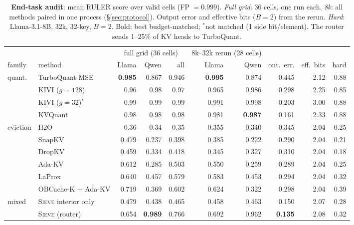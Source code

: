 \documentclass{article}
\newif\ifshowest \showesttrue
\DeclareRobustCommand{\est}[1]{\ifshowest{\color{estcol}#1}\else---\fi}
\DeclareRobustCommand{\estalt}[2]{\ifshowest#1\else#2\fi}
\newcommand{\sieve}{\textsc{Sieve}}
\theoremstyle{definition}
\begin{document}
\begin{table}[t]
\centering
\footnotesize
\setlength{\tabcolsep}{2.6pt}
\caption{\textbf{End-task audit}: mean RULER score over valid cells (FP $=0.999$). \emph{Full grid}: 36 cells, one run each. \emph{8k}: all methods paired in one process (\S\ref{sec:protocol}).
Output error and effective bits ($B=2$) from the rerun. \emph{Hard}: Llama-3.1-8B, 32k, 32-key, $B=2$. Bold: best budget-matched; $^\ast$not matched (1 side bit/element). The router sends 1--25\% of KV heads to TurboQuant.
}
\label{tab:endtask}
\begin{tabular}{@{}llrrrrrrrr@{}}
\toprule
& & \multicolumn{3}{c}{full grid (36 cells)} & \multicolumn{2}{c}{8k--32k rerun (28 cells)} & & & \\
\cmidrule(lr){3-5}\cmidrule(lr){6-7}
family & method & Llama & Qwen & all & Llama & Qwen & out.\ err. & eff.\ bits & hard \\
\midrule
\multirow{4}{*}{quant.} & TurboQuant-MSE & \textbf{0.985} & 0.867 & 0.946 & \textbf{0.995} & 0.874 & 0.445 & 2.12 & \est{0.88} \\
 & KIVI ($g{=}128$) & \est{0.96} & \est{0.98} & \est{0.97} & 0.965 & 0.986 & 0.298 & 2.25 & \est{0.85} \\
 & KIVI ($g{=}32$)$^\ast$ & \est{0.99} & \est{0.99} & \est{0.99} & 0.991 & 0.998 & 0.203 & 3.00 & \est{0.88} \\
 & KVQuant & \est{0.98} & \est{0.98} & \est{0.98} & 0.981 & \textbf{0.987} & 0.161 & 2.33 & \est{0.88} \\
\midrule
\multirow{6}{*}{eviction} & H2O & \est{0.36} & \est{0.34} & \est{0.35} & 0.355 & 0.340 & 0.345 & 2.04 & \est{0.25} \\
 & SnapKV & 0.479 & 0.237 & 0.398 & 0.385 & 0.222 & 0.290 & 2.04 & \est{0.21} \\
 & DropKV & 0.459 & 0.334 & 0.418 & 0.345 & 0.327 & 0.310 & 2.04 & \est{0.18} \\
 & Ada-KV & 0.612 & 0.285 & 0.503 & 0.550 & 0.259 & 0.289 & 2.04 & \est{0.25} \\
 & LaProx & 0.640 & 0.457 & 0.579 & 0.583 & 0.453 & 0.294 & 2.04 & \est{0.32} \\
 & OBCache-K + Ada-KV & 0.719 & 0.369 & 0.602 & 0.624 & 0.322 & 0.298 & 2.04 & \est{0.39} \\
\midrule
\multirow{2}{*}{mixed} & \sieve{} interior only & 0.479 & 0.438 & 0.465 & 0.458 & 0.463 & 0.150 & 2.07 & \est{0.28} \\
 & \sieve{} (router) & 0.654 & \textbf{0.989} & 0.766 & 0.692 & 0.962 & \textbf{0.135} & 2.08 & \est{0.32} \\
\bottomrule
\end{tabular}
\vspace{-2mm}
\end{table}
\end{document}
